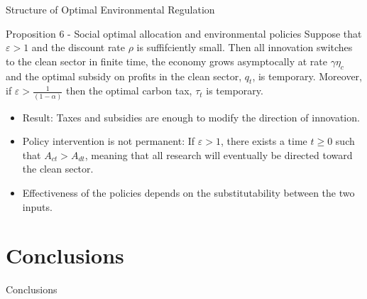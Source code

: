 \documentclass[aspectratio=169,xcolor=dvipsnames]{beamer}
\begin{document}
\begin{frame}{Structure of Optimal Environmental Regulation}
    \begin{block}{Proposition 6 - Social optimal allocation and environmental policies}
    Suppose that $\varepsilon > 1$ and the discount rate $\rho$ is suffifciently small. Then all innovation switches to the clean sector in finite time, the economy grows asymptocally at rate $\gamma \eta_c$ and the optimal subsidy on profits in the clean sector, $q_t$, is temporary. Moreover, if $\varepsilon > \frac{1}{(1-\alpha)}$ then the optimal carbon tax, $\tau_t$ is temporary.
    \end{block}
\begin{itemize}
\item Result: Taxes and subsidies are enough to modify the direction of innovation.
\item Policy intervention is not permanent: If $\varepsilon > 1$, there exists a time $t \geq 0$ such that $A_{ct} > A_{dt}$, meaning that all research will eventually be directed toward the clean sector.
\item Effectiveness of the policies depends on the substitutability between the two inputs.
\end{itemize}
\end{frame}

\section{Conclusions}

\begin{frame}{}
\centering
\Large Conclusions
\end{frame}
\end{document}

